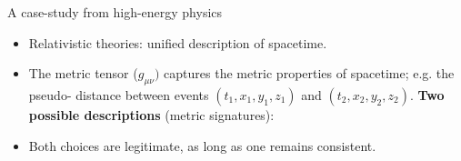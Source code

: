 \documentclass[10pt]{beamer}
\begin{document}
\begin{frame}{A case-study from high-energy physics}
    \begin{itemize}
        \item<1-> Relativistic theories: unified description of spacetime.
        \item<2-> The metric tensor ($g_{\mu\nu})$ captures the metric properties of spacetime; e.g. the pseudo- distance between events $(t_1,x_1,y_1,z_1)$ and $(t_2,x_2,y_2,z_2)$. \textbf{Two possible descriptions} (metric signatures):
    \end{itemize}
    
    \vspace{1em}




    \begin{itemize}
        \item<5-> Both choices are legitimate, as long as one remains consistent.
    \end{itemize}
\end{frame}
\end{document}
